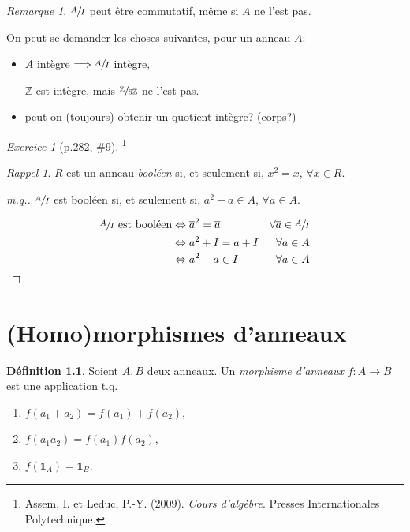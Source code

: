 \documentclass{report}
\theoremstyle{definition}
\newtheorem*{dfn}{D\'efinition}
\theoremstyle{remark}
\newtheorem*{exer}{Exercice}
\newtheorem*{rmq}{Remarque}
\newtheorem*{rapp}{Rappel}
\def\ZZ{\mathbb{Z}}
\def\id{\mathds{1}}
\begin{document}
	\begin{rmq}
		$\sfrac{A}{I}$ peut \^etre commutatif, m\^eme si $A$ ne l'est pas.
	\end{rmq}

	On peut se demander les choses suivantes, pour un anneau $A$:
	\begin{itemize}
		\item $A$ int\`egre $\Longrightarrow \sfrac{A}{I}$ int\`egre,

		$\ZZ$ est int\`egre, mais $\sfrac{\ZZ}{6\ZZ}$ ne l'est pas.
		\item peut-on (toujours) obtenir un quotient int\`egre? (corps?)
	\end{itemize}

	\begin{exer}[p.282, \#9]\footnote{Assem, I. et Leduc, P.-Y. (2009). \textit{Cours d'algèbre}. Presses Internationales Polytechnique.}

	\begin{rapp}
		$R$ est un anneau \emph{bool\'een} si, et seulement si, $x^2=x$, $\forall x\in R$.
	\end{rapp}

	\begin{proof}[m.q.]
		$\sfrac{A}{I}$ est bool\'een si, et seulement si, $a^2-a\in A$, $\forall a\in A$.

		\begin{align*}
			\sfrac{A}{I}\text{ est bool\'een}&\Leftrightarrow \overline{a}^2=\overline{a}&\forall\overline{a}\in \sfrac{A}{I}\\
			&\Leftrightarrow a^2+I=a+I&\forall a\in A\\
			&\Leftrightarrow a^2-a\in I&\forall a\in A
		\end{align*}
	\end{proof}
	\end{exer}

	\chapter[Morphismes d'anneaux]{(Homo)morphismes d'anneaux}
	\begin{dfn}
		Soient $A,B$ deux anneaux. Un \emph{morphisme d'anneaux} $f:A\to B$ est une application t.q.
		\begin{enumerate}
			\item $f(a_1+a_2)=f(a_1)+f(a_2)$,
			\item $f(a_1a_2)=f(a_1)f(a_2)$,
			\item $f(\id_A)=\id_B$.
		\end{enumerate}
	\end{dfn}
\end{document}
